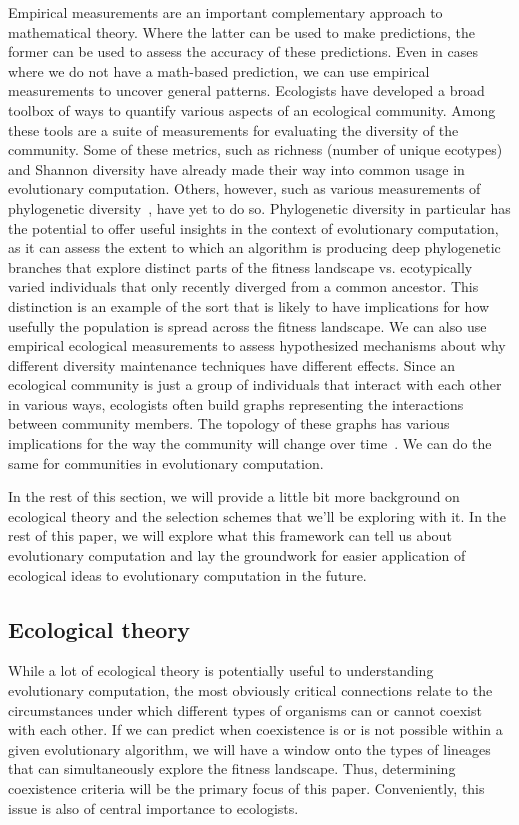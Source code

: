 Empirical measurements are an important complementary approach to mathematical theory. Where the latter can be used to make predictions, the former can be used to assess the accuracy of these predictions. Even in cases where we do not have a math-based prediction, we can use empirical measurements to uncover general patterns. Ecologists have developed a broad toolbox of ways to quantify various aspects of an ecological community. Among these tools are a suite of measurements for evaluating the diversity of the community. Some of these metrics, such as richness (number of unique ecotypes) and Shannon diversity have already made their way into common usage in evolutionary computation. Others, however, such as various measurements of phylogenetic diversity~\cite{winter_phylogenetic_2013}, have yet to do so. Phylogenetic diversity in particular has the potential to offer useful insights in the context of evolutionary computation, as it can assess the extent to which an algorithm is producing deep phylogenetic branches that explore distinct parts of the fitness landscape vs. ecotypically varied individuals that only recently diverged from a common ancestor. This distinction is an example of the sort that is likely to have implications for how usefully the population is spread across the fitness landscape. We can also use empirical ecological measurements to assess hypothesized mechanisms about why different diversity maintenance techniques have different effects. Since an ecological community is just a group of individuals that interact with each other in various ways, ecologists often build graphs representing the interactions between community members. The topology of these graphs has various implications for the way the community will change over time~\cite{fontaine_ecological_2011}. We can do the same for communities in evolutionary computation.

In the rest of this section, we will provide a little bit more background on ecological theory and the selection schemes that we'll be exploring with it. In the rest of this paper, we will explore what this framework can tell us about evolutionary computation and lay the groundwork for easier application of ecological ideas to evolutionary computation in the future.

\subsection{Ecological theory}

While a lot of ecological theory is potentially useful to understanding evolutionary computation, the most obviously critical connections relate to the circumstances under which different types of organisms can or cannot coexist with each other. If we can predict when coexistence is or is not possible within a given evolutionary algorithm, we will have a window onto the types of lineages that can simultaneously explore the fitness landscape. Thus, determining coexistence criteria will be the primary focus of this paper. Conveniently, this issue is also of central importance to ecologists.

